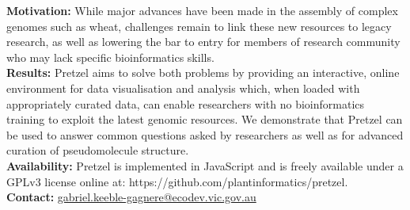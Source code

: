 \textbf{Motivation:}
While major advances have been made in the assembly of complex genomes such as wheat, challenges remain to link these new resources to legacy research, as well as lowering the bar to entry for members of research community who may lack specific bioinformatics skills. %
\\
\textbf{Results:} 
Pretzel aims to solve both problems by providing an interactive, online environment for data visualisation and analysis which, when loaded with appropriately curated data, can enable researchers with no bioinformatics training to exploit the latest genomic resources. 
We demonstrate that Pretzel can be used to answer common questions asked by researchers as well as for advanced curation of pseudomolecule structure.
\\
\textbf{Availability:} 
Pretzel is implemented in JavaScript and is freely available under a GPLv3 license online at: {{https://github.com/plantinformatics/pretzel}}.
\\
\textbf{Contact:}
\href{gabriel.keeble-gagnere@ecodev.vic.gov.au}{gabriel.keeble-gagnere@ecodev.vic.gov.au}\\
